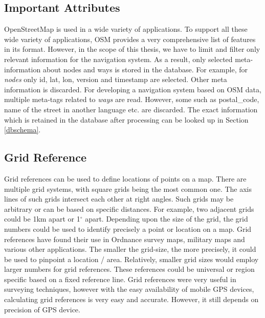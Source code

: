 \subsection{Important Attributes}\label{osmattributes}
OpenStreetMap is used in a wide variety of applications. To support all these wide variety of applications, OSM provides a very comprehensive list of features in its format. However, in the scope of this thesis, we have to limit and filter only relevant information for the navigation system. As a result, only selected meta-information about nodes and ways is stored in the database. For example, for \textit{nodes} only id, lat, lon, version and timestamp are selected. Other meta information is discarded. For developing a navigation system based on OSM data, multiple meta-tags related to \textit{ways} are read. However, some such as postal{\_}code, name of the street in another language etc. are discarded. The exact information which is retained in the database after processing can be looked up in Section \ref{dbschema}.

\subsection{Grid Reference} \label{grids}
Grid references can be used to define locations of points on a map. There are multiple grid systems, with square grids being the most common one. The axis lines of such grids intersect each other at right angles. Such grids may be arbitrary or can be based on specific distances. For example, two adjacent grids could be 1km apart or 1$^{\circ}$ apart. Depending upon the size of the grid, the grid numbers could be used to identify precisely a point or location on a map. Grid references have found their use in Ordnance survey maps, military maps and various other applications. The smaller the grid-size, the more precisely, it could be used to pinpoint a location / area. Relatively, smaller grid sizes would employ larger numbers for grid references. These references could be universal or region specific based on a fixed reference line. Grid references were very useful in surveying techniques, however with the easy availability of mobile GPS devices, calculating grid references is very easy and accurate. However, it still depends on precision of GPS device.\\



